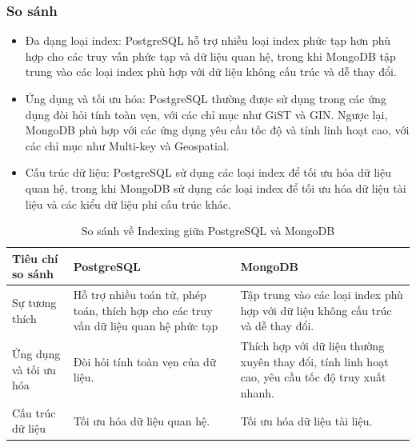 \subsubsection{So sánh}
\begin{itemize}
    \item Đa dạng loại index: PostgreSQL hỗ trợ nhiều loại index phức tạp hơn phù hợp cho các truy vấn phức tạp và dữ liệu quan hệ, trong khi MongoDB tập trung vào các loại index phù hợp với dữ liệu không cấu trúc và dễ thay đổi.
    \item Ứng dụng và tối ưu hóa: PostgreSQL thường được sử dụng trong các ứng dụng đòi hỏi tính toàn vẹn, với các chỉ mục như GiST và GIN. Ngược lại, MongoDB phù hợp với các ứng dụng yêu cầu tốc độ và tính linh hoạt cao, với các chỉ mục như Multi-key và Geospatial.
    \item  Cấu trúc dữ liệu: PostgreSQL sử dụng các loại index để tối ưu hóa dữ liệu quan hệ, trong khi MongoDB sử dụng các loại index để tối ưu hóa dữ liệu tài liệu và các kiểu dữ liệu phi cấu trúc khác.
\end{itemize}
\begin{table}[H]
    \centering
    \begin{tabular}{|L{3.2cm}|L{5cm}|L{5cm}|} \hline 
         \textbf{Tiêu chí so sánh }&  \textbf{PostgreSQL}&  \textbf{MongoDB}\\ \hline 
         Sự tương thích &  Hỗ trợ nhiều toán tử, phép toán, thích hợp cho các truy vấn dữ liệu quan hệ phức tạp & Tập trung vào các loại index phù hợp với dữ liệu không cấu trúc và dễ thay đổi.\\ \hline 
         Ứng dụng và tối ưu hóa &  Đòi hỏi tính toàn vẹn của dữ liệu. & Thích hợp với dữ liệu thường xuyên thay đổi, tính linh hoạt cao, yêu cầu tốc độ truy xuất nhanh.\\ \hline 
         Cấu trúc dữ liệu &  Tối ưu hóa dữ liệu quan hệ. &  Tối ưu hóa dữ liệu tài liệu.\\ \hline
    \end{tabular}
    \caption{So sánh về Indexing giữa PostgreSQL và MongoDB}
    \label{tab:indexing}
\end{table}
\newpage





